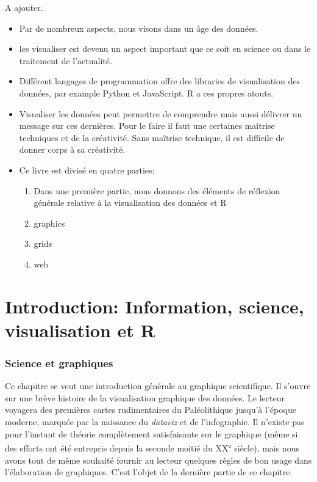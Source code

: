 \documentclass[]{article}
\providecommand{\tightlist}{%
  \setlength{\itemsep}{0pt}\setlength{\parskip}{0pt}}
\begin{document}
A ajouter.

\begin{itemize}
\item
  Par de nombreux aspects, nous visons dans un âge des données.
\item
  les visualiser est devenu un aspect important que ce soit en science ou dans le traitement de l'actualité.
\item
  Différent langages de programmation offre des libraries de visualisation des données, par example Python et JavaScript. R a ces propres atouts.
\item
  Visualiser les données peut permettre de comprendre mais aussi délivrer un message sur ces dernières. Pour le faire il faut une certaines maîtrise techniques et de la créativité. Sans maîtrise technique, il est difficile de donner corps à sa créativité.
\item
  Ce livre est divisé en quatre parties:

  \begin{enumerate}
  \def\labelenumi{\arabic{enumi}.}
  \tightlist
  \item
    Dans une première partie, nous donnons des éléments de réflexion générale relative à la visualisation des données et R
  \item
    graphics
  \item
    grids
  \item
    web
  \end{enumerate}
\end{itemize}

\hypertarget{part-introduction-information-science-visualisation-et-r}{%
\part{Introduction: Information, science, visualisation et R}\label{part-introduction-information-science-visualisation-et-r}}

\hypertarget{science-et-graphiques}{%
\section{Science et graphiques}\label{science-et-graphiques}}

Ce chapitre se veut une introduction générale au graphique scientifique. Il s'ouvre sur une brève histoire de la visualisation graphique des données. Le lecteur voyagera des premières cartes rudimentaires du Paléolithique jusqu'à l'époque moderne, marquée par la naissance du \emph{dataviz} et de l'infographie. Il n'existe pas pour l'instant de théorie complètement satisfaisante sur le graphique (même si des efforts ont été entrepris depuis la seconde moitié du XX\textsuperscript{e} siècle), mais nous avons tout de même souhaité fournir au lecteur quelques règles de bon usage dans l'élaboration de graphiques. C'est l'objet de la dernière partie de ce chapitre.
\end{document}
